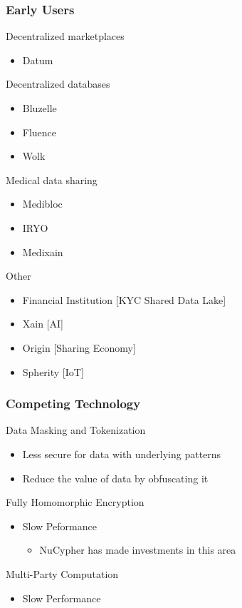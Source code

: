 \documentclass[xetex,mathsans,sans]{beamer}
\begin{document}
    \begin{frame}
      \frametitle{Early Users}
      Decentralized marketplaces
      \begin{itemize}
          \item Datum
      \end{itemize}
      Decentralized databases
      \begin{itemize}
          \item Bluzelle
          \item Fluence
          \item Wolk
      \end{itemize}
      Medical data sharing
      \begin{itemize}
          \item Medibloc
          \item IRYO
          \item Medixain
      \end{itemize}
      Other
      \begin {itemize}
          \item Financial Institution [KYC Shared Data Lake]
          \item Xain [AI]
          \item Origin [Sharing Economy]
          \item Spherity [IoT]
      \end{itemize}
    \end{frame}

    \begin{frame}
      \frametitle{Competing Technology}
       Data Masking and Tokenization
       \begin{itemize}
           \item Less secure for data with underlying patterns
           \item Reduce the value of data by obfuscating it
       \end{itemize}
      
       Fully Homomorphic Encryption
       \begin{itemize}
           \item Slow Peformance
           \begin{itemize}
               \item NuCypher has made investments in this area
           \end{itemize}
       \end{itemize}
       
       Multi-Party Computation
       \begin{itemize}
           \item Slow Performance
       \end{itemize}
     \end{frame}
    
\end{document}
